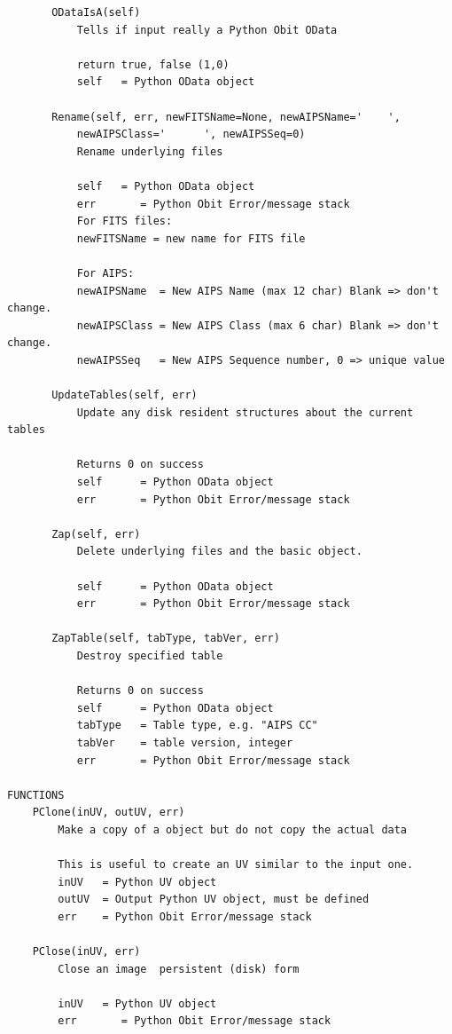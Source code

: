 \documentclass[11pt]{report}
\begin{document}
\begin{verbatim}
       ODataIsA(self)
           Tells if input really a Python Obit OData
           
           return true, false (1,0)
           self   = Python OData object
       
       Rename(self, err, newFITSName=None, newAIPSName='    ',
           newAIPSClass='      ', newAIPSSeq=0)
           Rename underlying files
           
           self   = Python OData object
           err       = Python Obit Error/message stack
           For FITS files:
           newFITSName = new name for FITS file
           
           For AIPS:
           newAIPSName  = New AIPS Name (max 12 char) Blank => don't change.
           newAIPSClass = New AIPS Class (max 6 char) Blank => don't change.
           newAIPSSeq   = New AIPS Sequence number, 0 => unique value
       
       UpdateTables(self, err)
           Update any disk resident structures about the current tables
           
           Returns 0 on success
           self      = Python OData object
           err       = Python Obit Error/message stack
       
       Zap(self, err)
           Delete underlying files and the basic object.
           
           self      = Python OData object
           err       = Python Obit Error/message stack
       
       ZapTable(self, tabType, tabVer, err)
           Destroy specified table
           
           Returns 0 on success
           self      = Python OData object
           tabType   = Table type, e.g. "AIPS CC"
           tabVer    = table version, integer
           err       = Python Obit Error/message stack

FUNCTIONS
    PClone(inUV, outUV, err)
        Make a copy of a object but do not copy the actual data
        
        This is useful to create an UV similar to the input one.
        inUV   = Python UV object
        outUV  = Output Python UV object, must be defined
        err    = Python Obit Error/message stack
    
    PClose(inUV, err)
        Close an image  persistent (disk) form
        
        inUV   = Python UV object
        err       = Python Obit Error/message stack
    

\end{verbatim}
\end{document}
